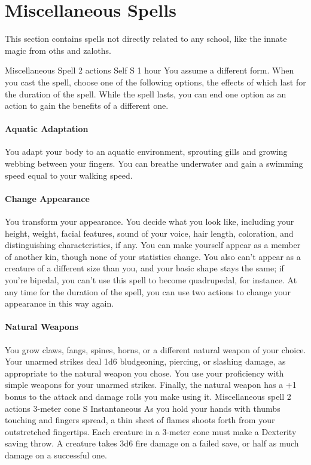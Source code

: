 \section{Miscellaneous Spells}
This section contains spells not directly related to any school, like the innate magic from oths and zaloths.

    {Miscellaneous Spell}
    {2 actions}
    {Self}
    {S}
    {1 hour}
    You assume a different form.
    When you cast the spell, choose one of the following options, the effects of which last for the duration of the spell.
    While the spell lasts, you can end one option as an action to gain the benefits of a different one.

    \paragraph{Aquatic Adaptation}
        You adapt your body to an aquatic environment, sprouting gills and growing webbing between your fingers.
        You can breathe underwater and gain a swimming speed equal to your walking speed.

    \paragraph{Change Appearance}
        You transform your appearance.
        You decide what you look like, including your height, weight, facial features, sound of your voice, hair length, coloration, and distinguishing characteristics, if any.
        You can make yourself appear as a member of another kin, though none of your statistics change.
        You also can't appear as a creature of a different size than you, and your basic shape stays the same; if you're bipedal, you can't use this spell to become quadrupedal, for instance.
        At any time for the duration of the spell, you can use two actions to change your appearance in this way again.

    \paragraph{Natural Weapons}
        You grow claws, fangs, spines, horns, or a different natural weapon of your choice.
        Your unarmed strikes deal 1d6 bludgeoning, piercing, or slashing damage, as appropriate to the natural weapon you chose.
        You use your proficiency with simple weapons for your unarmed strikes.
        Finally, the natural weapon has a +1 bonus to the attack and damage rolls you make using it.
    {Miscellaneous spell}
    {2 actions}
    {3-meter cone}
    {S}
    {Instantaneous}
    As you hold your hands with thumbs touching and fingers spread, a thin sheet of flames shoots forth from your outstretched fingertips.
    Each creature in a 3-meter cone must make a Dexterity saving throw.
    A creature takes 3d6 fire damage on a failed save, or half as much damage on a successful one.

